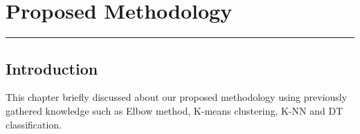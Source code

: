 \documentclass[document.tex]{subfiles}
\begin{document}
	
	
	\chapter{Proposed Methodology}
	\hrule
	\newpage
	\section{Introduction}
	This chapter briefly discussed about our proposed methodology using previously gathered knowledge such as Elbow method, K-means clustering, K-NN and DT classification.
\end{document}
